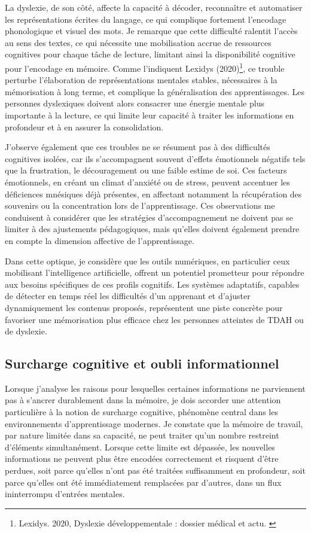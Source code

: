 \documentclass[11pt,a4paper]{report}
\begin{document}
La dyslexie, de son côté, affecte la capacité à décoder, reconnaître et automatiser les représentations écrites du langage, ce qui complique fortement l’encodage phonologique et visuel des mots. Je remarque que cette difficulté ralentit l’accès au sens des textes, ce qui nécessite une mobilisation accrue de ressources cognitives pour chaque tâche de lecture, limitant ainsi la disponibilité cognitive pour l’encodage en mémoire. Comme l’indiquent Lexidys (2020)\footnote{Lexidys. 2020, Dyslexie développementale : dossier médical et actu. \cite{lexidys}}, ce trouble perturbe l’élaboration de représentations mentales stables, nécessaires à la mémorisation à long terme, et complique la généralisation des apprentissages. Les personnes dyslexiques doivent alors consacrer une énergie mentale plus importante à la lecture, ce qui limite leur capacité à traiter les informations en profondeur et à en assurer la consolidation.

J’observe également que ces troubles ne se résument pas à des difficultés cognitives isolées, car ils s’accompagnent souvent d’effets émotionnels négatifs tels que la frustration, le découragement ou une faible estime de soi. Ces facteurs émotionnels, en créant un climat d’anxiété ou de stress, peuvent accentuer les déficiences mnésiques déjà présentes, en affectant notamment la récupération des souvenirs ou la concentration lors de l’apprentissage. Ces observations me conduisent à considérer que les stratégies d’accompagnement ne doivent pas se limiter à des ajustements pédagogiques, mais qu’elles doivent également prendre en compte la dimension affective de l’apprentissage.

Dans cette optique, je considère que les outils numériques, en particulier ceux mobilisant l’intelligence artificielle, offrent un potentiel prometteur pour répondre aux besoins spécifiques de ces profils cognitifs. Les systèmes adaptatifs, capables de détecter en temps réel les difficultés d’un apprenant et d’ajuster dynamiquement les contenus proposés, représentent une piste concrète pour favoriser une mémorisation plus efficace chez les personnes atteintes de TDAH ou de dyslexie.

\subsection{Surcharge cognitive et oubli informationnel}

Lorsque j’analyse les raisons pour lesquelles certaines informations ne parviennent pas à s’ancrer durablement dans la mémoire, je dois accorder une attention particulière à la notion de surcharge cognitive, phénomène central dans les environnements d’apprentissage modernes. Je constate que la mémoire de travail, par nature limitée dans sa capacité, ne peut traiter qu’un nombre restreint d’éléments simultanément. Lorsque cette limite est dépassée, les nouvelles informations ne peuvent plus être encodées correctement et risquent d’être perdues, soit parce qu’elles n’ont pas été traitées suffisamment en profondeur, soit parce qu’elles ont été immédiatement remplacées par d’autres, dans un flux ininterrompu d’entrées mentales.
\end{document}
